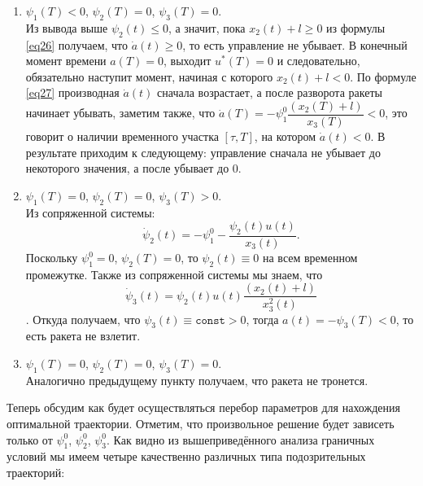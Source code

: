 \documentclass[a4paper,12pt]{article}
\begin{document}
\begin{itemize}
\begin{enumerate}
\item $\psi_1(T) < 0$, $\psi_2(T) = 0$, $\psi_3(T) = 0$. \\
Из вывода выше $\psi_2(t) \leqslant 0$, а значит, пока $x_2(t) + l \geqslant 0$ из формулы \eqref{eq26} получаем, что $\dot{a}(t) \geqslant 0$, то есть управление не убывает. В конечный момент времени $a(T) = 0$, выходит $u^*(T) = 0$ и следовательно, обязательно наступит момент, начиная с которого $x_2(t) + l < 0$. По формуле \eqref{eq27} производная $\dot{a}(t)$ сначала возрастает, а после разворота ракеты начинает убывать, заметим также, что $\dot{a}(T) = -\psi_1^0 \dfrac{ (x_2(T) + l)}{x_3(T)} < 0$, это говорит о наличии временного участка $[\tau, T]$, на котором $\dot{a}(t) < 0$. В результате приходим к следующему: управление сначала не убывает до некоторого значения, а после убывает до 0.

\item $\psi_1(T) = 0$, $\psi_2(T) = 0$, $\psi_3(T) > 0$. \\
Из сопряженной системы:
\[ \dot{\psi}_2(t) = - \psi_1^0 - \dfrac{\psi_{2}(t)u(t)}{x_{3}(t)}. \]
Поскольку $\psi_1^0 = 0$, $\psi_2(T) = 0$, то $\psi_2(t) \equiv 0$ на всем временном промежутке. Также из сопряженной системы мы знаем, что
\[ \dot{\psi}_3(t) = \psi_2(t)u(t) \dfrac{(x_2(t) + l)}{x_3^2(t)} \]. 
Откуда получаем, что $\psi_3(t) \equiv \texttt{const} > 0$, тогда $a(t) = -\psi_3(T) < 0$, то есть ракета не взлетит.

\item $\psi_1(T) = 0$, $\psi_2(T) = 0$, $\psi_3(T) = 0$. \\
Аналогично предыдущему пункту получаем, что ракета не тронется.
\end{enumerate}

Теперь обсудим как будет осуществляться перебор параметров для нахождения оптимальной траектории. Отметим, что произвольное решение будет зависеть только от $\psi_1^0$, $\psi_2^0$, $\psi_3^0$. Как видно из вышеприведённого анализа граничных условий мы имеем четыре качественно различных типа подозрительных траекторий:
\begin{enumerate}


\end{enumerate}
\end{itemize}
\end{document}

